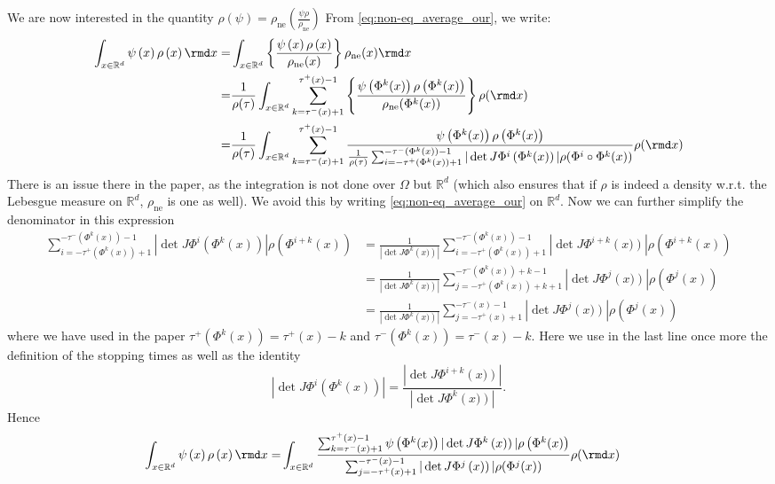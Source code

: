 We are now interested in the quantity $\rho(\psi) = \rho_{\mathrm{ne}}\left(\frac{\psi \rho}{\rho_{\mathrm{ne}}}\right)$
From \eqref{eq:non-eq_average_our}, we write:
\begin{alignat*}{1}
\int_{x\in \mathbb{R}^{d}}\psi\left(x\right)\rho\left(x\right)\rmd x= & \int_{x\in \mathbb{R}^{d}}\left\{\frac{\psi\left(x\right)\rho\left(x\right)}{\rho_{\mathrm{ne}}(x)}\right\}\rho_{\mathrm{ne}}(x)\rmd x\\
= & \frac{1}{\rho(\tau)} \int_{x\in \mathbb{R}^{d}} \sum_{k=\tau^-(x)+1}^{\tau^+(x)-1}\left\{\frac{\psi\left(\Phi^k(x)\right)\rho\left(\Phi^k(x)\right)}{\rho_{\mathrm{ne}}(\Phi^k(x))}\right\} \rho(\rmd x) 
\\
=& \frac{1}{\rho(\tau)} \int_{x\in \mathbb{R}^{d}} \sum_{k=\tau^-(x)+1}^{\tau^+(x)-1}\frac{\psi\left(\Phi^k(x)\right)\rho\left(\Phi^k(x)\right)}{ \frac{1}{\rho(\tau)}\sum_{i=-\tau^{+}\left(\Phi^{k}(x)\right)+1}^{-\tau^{-}\left(\Phi^{k}(x)\right)-1}|\det J\Phi^{i}\left(\Phi^{k}(x)\right)|\rho(\Phi^{i}\circ\Phi^{k}(x))} \rho(\rmd x) 
\end{alignat*}
There is an issue there in the paper, as the integration is not done over $\Omega$ but $\mathbb{R}^{d}$ (which also ensures that if $\rho$ is indeed a density w.r.t. the Lebesgue measure on $\mathbb{R}^{d}$, $\rho_{\mathrm{ne}}$ is one as well). We avoid this by writing \eqref{eq:non-eq_average_our} on $\mathbb{R}^{d}$.
Now we can further simplify the denominator in this expression 
\begin{align*}
  \sum_{i=-\tau^{+}\left(\Phi^{k}(x)\right)+1}^{-\tau^{-}\left(\Phi^{k}(x)\right)-1}|\det J\Phi^{i}\left(\Phi^{k}(x)\right)|\rho(\Phi^{i+k}(x))
 & =\frac{1}{|\det J\Phi^{k}\left(x)\right)|}\sum_{i=-\tau^{+}\left(\Phi^{k}(x)\right)+1}^{-\tau^{-}\left(\Phi^{k}(x)\right)-1}|\det J\Phi^{i+k}\left(x)\right)|\rho(\Phi^{i+k}(x))\\
 & =\frac{1}{|\det J\Phi^{k}\left(x)\right)|}\sum_{j=-\tau^{+}\left(\Phi^{k}(x)\right)+k+1}^{-\tau^{-}\left(\Phi^{k}(x)\right)+k-1}|\det J\Phi^{j}\left(x)\right)|\rho(\Phi^{j}(x))\\
 & =\frac{1}{|\det J\Phi^{k}\left(x)\right)|}\sum_{j=-\tau^{+}\left(x\right)+1}^{-\tau^{-}\left(x\right)-1}|\det J\Phi^{j}\left(x)\right)|\rho(\Phi^{j}(x))
\end{align*}
where we have used in the paper $\tau^{+}\left(\Phi^{k}(x)\right)=\tau^{+}(x)-k$
and $\tau^{-}\left(\Phi^{k}(x)\right)=\tau^{-}\left(x\right)-k$. Here we use in the last line once more the definition
of the stopping times as well as the identity 
\[
|\det J\Phi^{i}\left(\Phi^{k}(x)\right)|=\frac{|\det J\Phi^{i+k}\left(x)\right)|}{|\det J\Phi^{k}\left(x)\right)|}.
\]
Hence 
\begin{align}
\label{eq:non-eq_estimator}
\int_{x\in \mathbb{R}^{d}}\psi\left(x\right)\rho\left(x\right)\rmd x=&  
\int_{x\in \mathbb{R}^{d}} \frac{\sum_{k=\tau^-(x)+1}^{\tau^+(x)-1}\psi\left(\Phi^k(x)\right)|\det J\Phi^{k}\left(x)\right)|\rho\left(\Phi^k(x)\right)}{\sum_{j=-\tau^{+}\left(x\right)+1}^{-\tau^{-}\left(x\right)-1}|\det J\Phi^{j}\left(x)\right)|\rho(\Phi^{j}(x))} \rho(\rmd x) 
\end{align}

